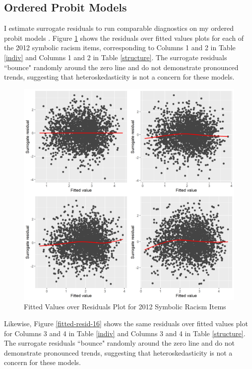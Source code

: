 \documentclass[12pt]{paper}
\begin{document}
\subsection{Ordered Probit Models}
I estimate surrogate residuals to run comparable diagnostics on my ordered probit models \citep{liu_residuals_2018}. Figure \ref{fitted-resid-12} shows the residuals over fitted values plots for each of the 2012 symbolic racism items, corresponding to Columns 1 and 2 in Table \ref{indiv} and Columns 1 and 2 in Table \ref{structure}. The surrogate residuals ``bounce" randomly around the zero line and do not demonstrate pronounced trends, suggesting that heteroskedasticity is not a concern for these models.

\begin{figure}[h!]
		\centering
	\includegraphics[scale=.55]{fig/fitted_residuals_12.png}
	\caption{Fitted Values over Residuals Plot for 2012 Symbolic Racism Items}
	\label{fitted-resid-12}
\end{figure}

Likewise, Figure \ref{fitted-resid-16} shows the same residuals over fitted values plot for Columns 3 and 4 in Table \ref{indiv} and Columns 3 and 4 in Table \ref{structure}. The surrogate residuals ``bounce" randomly around the zero line and do not demonstrate pronounced trends, suggesting that heteroskedasticity is not a concern for these models.
\end{document}
